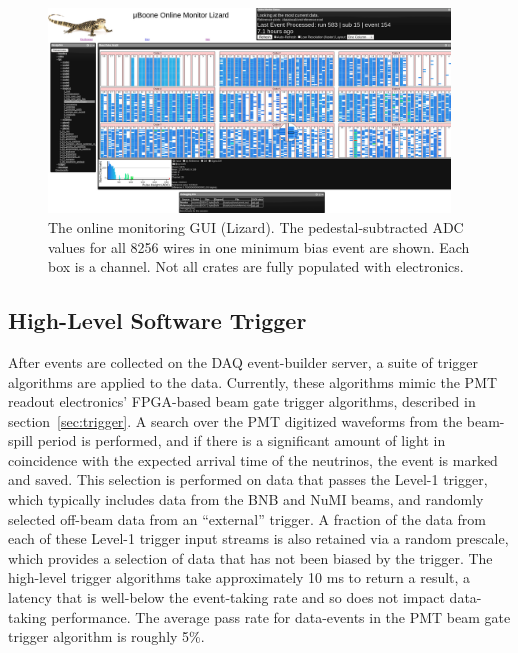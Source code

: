 \begin{figure}
\centering
\includegraphics[width=0.95\textwidth]{./figures/daqLizard.png}
\caption{The online monitoring GUI (Lizard). The pedestal-subtracted ADC values for all 8256 wires in one minimum bias event are shown. Each box is a channel. Not all crates are fully populated with electronics. }
\label{fig:onlinemonitor}
\end{figure}

\subsection{High-Level Software Trigger}
\label{sec:software-trigger}
After events are collected on the DAQ event-builder server, a suite of trigger algorithms are applied to the data. Currently, these algorithms mimic the PMT readout electronics' FPGA-based beam gate trigger algorithms, described in section~\ref{sec:trigger}. A search over the PMT digitized waveforms from the beam-spill period is performed, and if there is a significant amount of light in coincidence with the expected arrival time of the neutrinos, the event is marked and saved. This selection is performed on data that passes the Level-1 trigger, which typically includes data from the BNB and NuMI beams, and randomly selected off-beam data from an ``external'' trigger. A fraction of the data from each of these Level-1 trigger input streams is also retained via a random prescale, which provides a selection of data that has not been biased by the trigger. The high-level trigger algorithms take approximately 10 ms to return a result, a latency that is well-below the event-taking rate and so does not impact data-taking performance. The average pass rate for data-events in the PMT beam gate trigger algorithm is roughly 5\%. 


